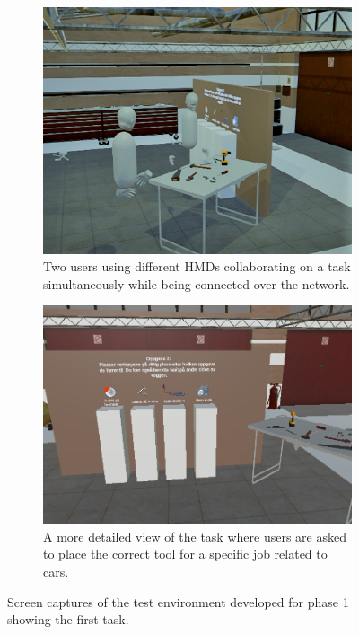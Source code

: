 \begin{figure}[]
  \centering
  \begin{subfigure}[b]{0.445\textwidth}
    \includegraphics[width=1\textwidth]{./fig/phase_1/phase1_capture2.PNG}
    \caption{Two users using different HMDs collaborating on a task simultaneously while being connected over the network.}
    \label{fig:task1WithUsers}
  \end{subfigure}
    \hfill%
  \begin{subfigure}[b]{0.5\textwidth}
    \includegraphics[width=1\textwidth]{fig/phase_1/phase1Task2.PNG}
    \caption{A more detailed view of the task where users are asked to place the correct tool for a specific job related to cars.}
    \label{fig:task1WithDetail}
  \end{subfigure}
  \hfill%
  \caption{Screen captures of the test environment developed for phase 1 showing the first task.}
  \label{fig:phase1Capture1}
\end{figure}


